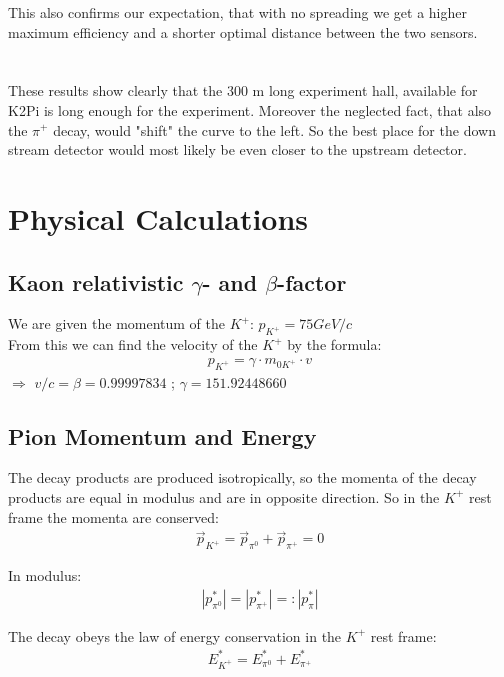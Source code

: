 \documentclass[a4paper,parskip,11pt, DIV12]{scrreprt}
\begin{document}
	This also confirms our expectation, that with no spreading we get a higher maximum efficiency and a shorter optimal distance between the two sensors.
	\\
	\\
	\\
	These results show clearly that the 300 m long experiment hall, available for K2Pi is long enough for the experiment. Moreover the neglected fact, that also the $\pi^+$ decay, would "shift" the curve to the left. So the best place for the down stream detector would most likely be even closer to the upstream detector. 
	\clearpage
	
	\chapter{Physical Calculations}
	
	\section{Kaon relativistic $\gamma$- and $\beta$-factor} \label{sec:gammabeta}
	
	We are given the momentum of the $K^+$: $p_{K^+} = 75 GeV/c$\\
	From this we can find the velocity of the $K^+$ by the formula:
	\begin{align*}
		p_{K^+} = \gamma \cdot m_{0K^+} \cdot v
	\end{align*}
	$\Rightarrow$
	$v/c = \beta = 0.99997834$ ;
	$\gamma = 151.92448660$\\
	
	\section{Pion Momentum and Energy} \label{sec:pE}
	
	The decay products are produced isotropically, so the momenta of the decay products are equal in modulus and are in opposite direction. 
	So in the $K^+$ rest frame the momenta are conserved:
	\begin{align*}
		\overrightarrow{p}_{K^+} = \overrightarrow{p}_{\pi^0} + \overrightarrow{p}_{\pi^+} = 0
	\end{align*}
	
	In modulus:
	\begin{align*}
		|p^*_{\pi^0}| = |p^*_{\pi^+}| =: |p^*_{\pi}|
	\end{align*}
	
	The decay obeys the law of energy conservation in the $K^+$ rest frame:
	\begin{align*}
		E^*_{K^+} = E^*_{\pi^0} + E^*_{\pi^+}
	\end{align*}
	
\end{document}
